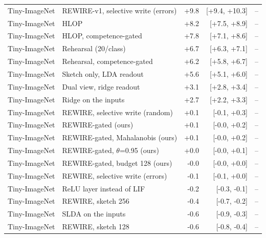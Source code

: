 \begin{tabular}{llrrr}
Tiny-ImageNet & REWIRE-v1, selective write (errors) & +9.8 & [+9.4, +10.3] & -- \\
Tiny-ImageNet & HLOP & +8.2 & [+7.5, +8.9] & -- \\
Tiny-ImageNet & HLOP, competence-gated & +7.8 & [+7.1, +8.6] & -- \\
Tiny-ImageNet & Rehearsal (20/class) & +6.7 & [+6.3, +7.1] & -- \\
Tiny-ImageNet & Rehearsal, competence-gated & +6.2 & [+5.8, +6.7] & -- \\
Tiny-ImageNet & Sketch only, LDA readout & +5.6 & [+5.1, +6.0] & -- \\
Tiny-ImageNet & Dual view, ridge readout & +3.1 & [+2.8, +3.4] & -- \\
Tiny-ImageNet & Ridge on the inputs & +2.7 & [+2.2, +3.3] & -- \\
Tiny-ImageNet & REWIRE, selective write (random) & +0.1 & [-0.1, +0.3] & -- \\
Tiny-ImageNet & REWIRE-gated (ours) & +0.1 & [-0.0, +0.2] & -- \\
Tiny-ImageNet & REWIRE-gated, Mahalanobis (ours) & +0.1 & [-0.0, +0.2] & -- \\
Tiny-ImageNet & REWIRE-gated, $\theta$=0.95 (ours) & +0.0 & [-0.0, +0.1] & -- \\
Tiny-ImageNet & REWIRE-gated, budget 128 (ours) & -0.0 & [-0.0, +0.0] & -- \\
Tiny-ImageNet & REWIRE, selective write (errors) & -0.1 & [-0.1, +0.0] & -- \\
Tiny-ImageNet & ReLU layer instead of LIF & -0.2 & [-0.3, -0.1] & -- \\
Tiny-ImageNet & REWIRE, sketch 256 & -0.4 & [-0.7, -0.2] & -- \\
Tiny-ImageNet & SLDA on the inputs & -0.6 & [-0.9, -0.3] & -- \\
Tiny-ImageNet & REWIRE, sketch 128 & -0.6 & [-0.8, -0.4] & -- \\
\bottomrule
\end{tabular}
